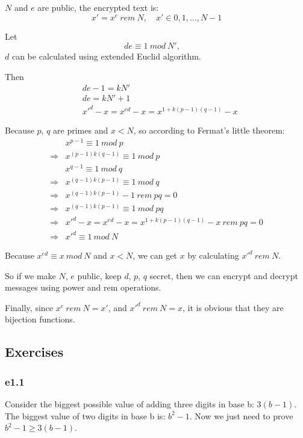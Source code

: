 \documentclass[11pt]{article}
\begin{document}
$N$ and $e$ are public, the encrypted text is:
\begin{equation}
  x' = x^e\ rem\ N, \quad
  x' \in {0, 1, \ldots, N-1}
\end{equation}

Let 
\begin{equation}
  de \equiv 1 \ mod\ N', \quad
\end{equation}
$d$ can be calculated using extended Euclid algorithm.

Then
\begin{align}
  & de - 1 = kN'\\
  & de = kN' + 1\\
  & x'^d-x = x^{ed} - x = x^{1+k(p-1)(q-1)}-x
\end{align}

Because $p$, $q$ are primes and $x < N$, so according to Fermat's
little theorem:
\begin{align}
  & x^{p-1} \equiv 1\ mod\ p\\
  \Rightarrow & x^{(p-1)k(q-1)} \equiv 1\ mod\ p\\  
  & x^{q-1} \equiv 1\ mod\ q\\
  \Rightarrow & x^{(q-1)k(p-1)} \equiv 1\ mod\ q\\
  \Rightarrow & x^{(q-1)k(p-1)}-1\ rem\ pq = 0\\
  \Rightarrow & x^{(q-1)k(p-1)} \equiv 1\ mod\ pq\\
  \Rightarrow & x'^d-x = x^{ed} - x = x^{1+k(p-1)(q-1)}-x\ rem\ pq = 0\\
  \Rightarrow & x'^d \equiv 1\ mod\ N
\end{align}

Because $x^{ed} \equiv x\ mod\ N$ and $x < N$, we can get $x$ by
calculating $x'^d\ rem\ N$.

So if we make $N$, $e$ public, keep $d$, $p$, $q$ secret, then we can
encrypt and decrypt messages using power and rem operations.

Finally, since $x^e\ rem\ N = x'$, and $x'^d\ rem\ N = x$, it is
obvious that they are bijection functions. 

\subsection{Exercises}

\subsubsection{e1.1}
Consider the biggest possible value of adding three digits in base b:
$3(b-1)$. The biggest value of two digits in base b is: $b^2-1$. Now
we just need to prove $b^2-1 \ge 3(b-1)$.
\end{document}
